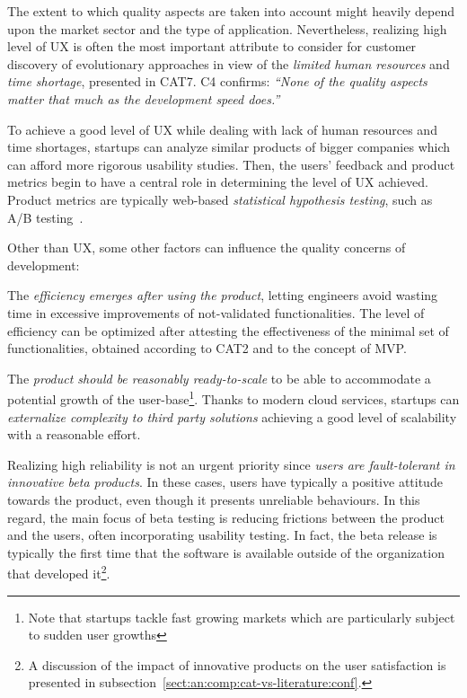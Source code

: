 \documentclass[10pt,journal,letterpaper,compsoc]{IEEEtran}
\begin{document}
The extent to which quality aspects are taken into account might heavily depend
upon the market sector and the type of application. Nevertheless, realizing high
level of UX is often the most important attribute to consider for customer
discovery of evolutionary approaches in view of the \textit{limited human
resources} and \textit{time shortage}, presented in CAT7. C4 confirms:
\textit{``None of the quality aspects matter that much as the development speed
does.''}

To achieve a good level of UX while dealing with lack of human resources and
time shortages, startups can analyze similar products of bigger companies which
can afford more rigorous usability studies. Then, the users' feedback and
product metrics begin to have a central role in determining the level of UX
achieved. Product metrics are typically web-based \textit{statistical hypothesis
testing}, such as A/B testing~\cite{AB}.

Other than UX, some other factors can influence the quality concerns of
development:


\begin{compactitem}

\item The \textit{efficiency emerges after using the product}, letting
engineers avoid wasting time in excessive improvements of not-validated
functionalities. The level of efficiency can be optimized after attesting the
effectiveness of the minimal set of functionalities, obtained according to CAT2
and to the concept of MVP. 
\item The \textit{product should be reasonably ready-to-scale} to be able to 
accommodate a potential growth of the user-base\footnote{Note that startups 
tackle fast growing markets which are particularly subject to sudden user 
growths}. Thanks to modern cloud services, startups can \textit{externalize 
complexity to third party solutions} achieving a good level of scalability with 
a reasonable effort. 
\item Realizing high reliability is not an urgent priority since \textit{users 
are fault-tolerant in innovative beta products}. In these cases, users have 
typically a positive attitude towards the product, even though it presents 
unreliable behaviours. In this regard, the main focus of beta testing is 
reducing frictions between the product and the users, often incorporating 
usability testing. In fact, the beta release is typically the first time that 
the software is available outside of the organization that developed 
it\footnote{A discussion of the impact of innovative products on the user 
satisfaction is presented in 
subsection~\ref{sect:an:comp:cat-vs-literature:conf}.}. 
\end{compactitem}
\end{document}
